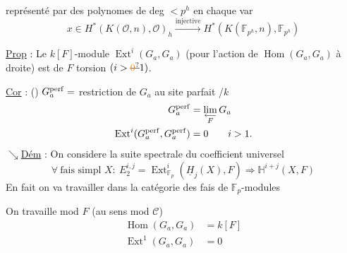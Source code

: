 représenté par des polynomes de deg $<p^h$ en chaque var
\[
x\in H^*(K(\mathcal O,n),\mathcal O)_h\xrightarrow{\text{injective}}H^*(K(\mathbb F_{p^h},n),\mathbb F_{p^h})
\]

\uline{Prop} : Le $k[F]$-module $\operatorname{Ext}^i(G_a,G_a)$ (pour l'action de $\operatorname{Hom}(G_a,G_a)$ à droite) est de $F$ torsion $(i>\deleted{\unsure{0}}1)$.

\uline{Cor} : () $G_a^{\rm perf}=$ restriction de $G_a$ au site parfait /$k$
\[
\begin{aligned}
G_a^{\rm perf}&=\lim_{\substack{\longleftarrow\\ F}}G_a\\
\operatorname{Ext}^i(G_a^{\rm perf},G_a^{\rm perf})&=0\qquad i>1.
\end{aligned}
\]
$\searrow$\quad\uline{Dém} : On considere la suite spectrale du coefficient universel
\[
\forall\ \text{fais simpl }X:\ E_2^{i,j}=\operatorname{Ext}^i_{\mathbb F_p}(\underline H_j(X),F)\Longrightarrow \mathbb H^{i+j}(X,F)
\]
En fait on va travailler dans la catégorie des fais de $\mathbb F_p$-modules

On travaille mod $F$ (au sens mod $\mathcal C$)
\[
\begin{aligned}
\operatorname{Hom}(G_a,G_a)&=k[F]\\
\operatorname{Ext}^1(G_a,G_a)&=0
\end{aligned}
\]

